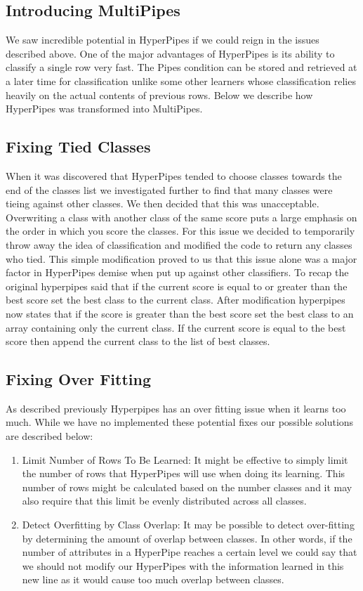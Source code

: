 \subsection{Introducing MultiPipes}
We saw incredible potential in HyperPipes if we could reign in
the issues described above. One of the major advantages of HyperPipes
is its ability to classify a single row very fast. The Pipes 
condition can be stored and retrieved at a later time for 
classification unlike some other learners whose classification 
relies heavily on the actual contents of previous rows. Below we 
describe how HyperPipes was transformed into MultiPipes.


\subsection{Fixing Tied Classes}
When it was discovered that HyperPipes tended to choose classes 
towards the end of the classes list we investigated further to 
find that many classes were tieing against other classes. We 
then decided that this was unacceptable. Overwriting a class 
with another class of the same score puts a large emphasis on 
the order in which you score the classes. For this issue we 
decided to temporarily throw away the idea of classification 
and modified the code to return any classes who tied. This 
simple modification proved to us that this issue alone was a 
major factor in HyperPipes demise when put up against other 
classifiers. To recap the original hyperpipes said that if 
the current score is equal to or greater than the best score 
set the best class to the current class. After modification 
hyperpipes now states that if the score is greater than the 
best score set the best class to an array containing only the 
current class. If the current score is equal to the best score 
then append the current class to the list of best classes.


\subsection{Fixing Over Fitting}
As described previously Hyperpipes has an over fitting issue 
when it learns too much. While we have no implemented these 
potential fixes our possible solutions are described below:
\begin{enumerate}
\item Limit Number of Rows To Be Learned: 
	It might be effective to simply limit the number of rows 
	that HyperPipes will use when doing its learning. This 
	number of rows might be calculated based on the number 
	classes and it may also require that this limit be 
	evenly distributed across all classes.
\item Detect Overfitting by Class Overlap:
	It may be possible to detect over-fitting by determining 
	the amount of overlap between classes. In other words, 
	if the number of attributes in a HyperPipe reaches a 
	certain level we could say that we should not modify our 
	HyperPipes with the information learned in this new line
	as it would cause too much overlap between classes.
\end{enumerate}


